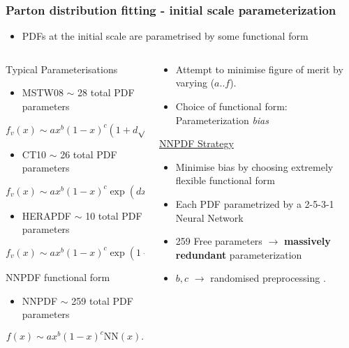 \documentclass[10pt]{beamer}
\newcommand{\be}{\begin{equation*}}
\newcommand{\ee}{\end{equation*}}
\begin{document}
\begin{frame}
\frametitle{Parton distribution fitting - initial scale parameterization}
\begin{itemize}
\item PDFs at the initial scale are parametrised by some functional form
\end{itemize}

\begin{columns}
\begin{column}{0.5\textwidth}
\begin{block} {\centering \small Typical Parameterisations}
\begin{itemize}
\item<1-> \small MSTW08 $\sim$ 28 total PDF parameters 
\end{itemize}
    \be f_v(x) \sim ax^{b}(1-x)^{c}(1+d\sqrt{x}+e x),\ee   \begin{itemize}
\item<1-> \small CT10   $\sim$ 26 total PDF parameters 
	\end{itemize}
	\small \be f_v(x) \sim ax^b(1-x)^c \exp{(dx + ex^2 + f\sqrt{x})}.\ee \begin{itemize}
\item<1-> \small HERAPDF   $\sim$ 10 total PDF parameters 
	\end{itemize}
		\small \be f_v(x) \sim ax^b(1-x)^c \exp{(1+dx + ex^2)}.\ee

\end{block}

\begin{block}
{ \small \centering NNPDF functional form}
\begin{itemize}
\item<1-> \small NNPDF $\sim$ 259 total PDF parameters 
\end{itemize}
\be f(x) \sim ax^b(1-x)^{c} \mathrm{NN}(x). \ee
\end{block}
\end{column}
	\begin{column}{0.4\textwidth}
	\small 
	
\begin{itemize} \small
\item<1-> Attempt to minimise figure of merit by varying ($a$..$f$).
\item<1-> Choice of functional form: Parameterization \emph{bias}
\end{itemize}
\vskip10pt
\begin{center}
\underline{NNPDF Strategy}\end{center}
\vskip-10pt
\begin{itemize} \small
\item<1-> Minimise bias by choosing extremely flexible functional form
\item<1-> Each PDF parametrized by a 2-5-3-1 Neural Network
\item<1-> 259 Free parameters $\to$ \textbf{massively redundant} parameterization
\item<1-> $b,c$  $\to$ randomised preprocessing .


\end{itemize}
\end{column}
\end{columns}
\end{frame}
\end{document}
